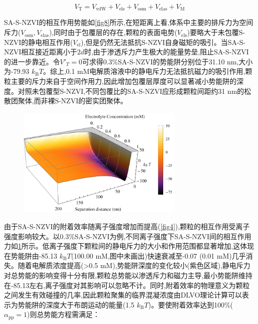 \begin{equation}
   V_\mathrm{T}=V_\mathrm{vdW}+V_\mathrm{els}+V_\mathrm{osm}+V_\mathrm{elas}+V_\mathrm{M} 
\end{equation}

SA-S-NZVI的相互作用势能如\cref{fig8}所示,在短距离上看,体系中主要的排斥力为空间斥力($V_\mathrm{osm},V_\mathrm{elas}$),同时由于包覆层的存在,颗粒的表面电势($V_\mathrm{els}$)要略大于未包覆S-NZVI的静电相互作用($V_\mathrm{el}$),但是仍然无法抵抗S-NZVI自身磁矩的吸引。当SA-S-NZVI相互接近距离小于$2d$时,由于渗透斥力产生极大的能量势垒,阻止SA-S-NZVI的进一步靠近。令$V'_T=0$可求得0.3\%SA-S-NZVI的势能阱分别位于31.10 nm,大小为-79.93 $k_\mathrm{B}T$。综上,0.1 mM电解质溶液中的静电斥力无法抵抗磁力的吸引作用,颗粒主要的斥力来自于空间作用力,因此增加包覆层厚度可以显著减小势能阱的深度。对照未包覆型S-NZVI,不同包覆比的SA-S-NZVI应形成颗粒间距约31 nm的松散团聚体,而非裸S-NZVI的密实团聚体。

\begin{figure}[h]
    \centering
    \includegraphics[width=8cm]{figs/fig11.pdf}
    \label{fig11}
\end{figure}

由于SA-S-NZVI的附着效率随离子强度增加而提高(\cref{fig4}),颗粒的相互作用受离子强度影响较大。以0.3\%SA-S-NZVI为例,不同离子强度下SA-S-NZVI间的相互作用力如\cref{fig11}所示。低离子强度下颗粒间的静电斥力的大小和作用范围都显著增加,这体现在势能阱由-85.13 $k_\mathrm{B}T$(100.00 mM,图中未画出)快速衰减至-0.07 (0.01 mM)几乎消失。随着电解质浓度提高(>0.5 mM),势能阱深度的变化较小(紫色区域),静电斥力对总势能的影响变得十分有限,颗粒总势能以渗透斥力和磁力主导,最小势能阱维持在-85.13左右,离子强度对其影响可以忽略不计。同时,附着效率的物理意义为颗粒之间发生有效碰撞的几率,因此颗粒聚集的临界混凝浓度由DLVO理论计算可以表示为势能阱的深度大于布朗运动的能量(1.5 $k_\mathrm{B}T$)。要使附着效率达到100\%($\alpha_\mathrm{pp}=1$)则总势能方程需满足：

